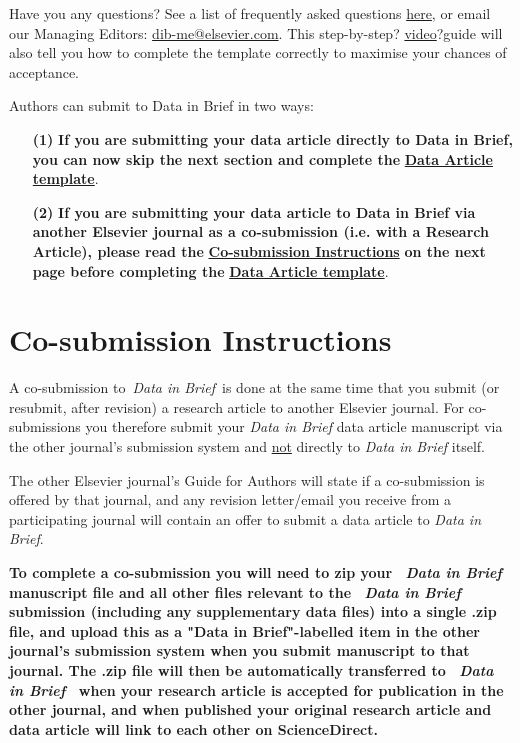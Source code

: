 \documentclass[times,final]{elsarticle}
\begin{document}
Have you any questions? See a list of frequently asked questions
\href{https://www.journals.elsevier.com/data-in-brief/about-data-in-brief/data-in-brief-faq}{here},
or email our Managing Editors:
\href{mailto:dib-me@elsevier.com}{dib-me@elsevier.com}. This
step-by-step?
\href{https://www.journals.elsevier.com/data-in-brief/about-data-in-brief/how-to-submit-your-research-data-article-data-in-brief}%
{video}?guide will also tell you how to complete the
template correctly to maximise your chances of acceptance.

\vskip6pt
\noindent Authors can submit to Data in Brief in two ways:

\begin{enumerate}
\item[\bf(1)] \textbf{If you are submitting your data article directly to Data in
Brief, you can now skip the next section and complete the}
\hyperlink{target2}{\textbf{Data Article template}}.

\item[\bf(2)] \textbf{If you are submitting your data article to Data in Brief via
another Elsevier journal as a co-submission (i.e. with a Research
Article), please read the} \hyperlink{target3}{\textbf{Co-submission Instructions}}
\textbf{on the next page
before completing the} \hyperlink{target2}{\textbf{Data Article template}}.

\end{enumerate}

\hypertarget{target3}{}
\section*{Co-submission Instructions}
A co-submission to~\textit{Data in Brief}~is done at the same time that you
submit (or resubmit, after revision) a research article to another
Elsevier journal. For co-submissions you therefore submit your
\textit{Data in Brief} data article manuscript via the other journal's
submission system and \underline{not} directly to
\textit{Data in Brief} itself.

\vskip6pt\noindent
The other Elsevier journal's Guide for Authors will state if a
co-submission is offered by that journal, and any revision letter/email
you receive from a participating journal will contain an offer to
submit a data article to \textit{Data in Brief}.

\vskip6pt\noindent
\textbf{To complete a co-submission you will need to zip your
~\textit{Data in Brief}~
manuscript file and all other files relevant to the
~\textit{Data in Brief}~
submission (including any supplementary data files) into a single .zip
file, and upload this as a "Data in Brief"-labelled item in the other
journal's submission system when you submit manuscript to that journal.
The .zip file will then be automatically transferred to
~\textit{Data in Brief}~
when your research article is accepted for publication in the other
journal, and when published your original research article and data
article will link to each other on ScienceDirect.}
\end{document}
